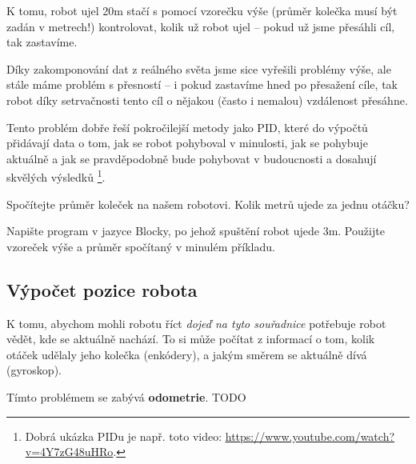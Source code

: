 \documentclass[../main.tex]{subfiles}
\begin{document}
	K tomu, robot ujel \si{20m} stačí s pomocí vzorečku výše (průměr kolečka musí být zadán v metrech!) kontrolovat, kolik už robot ujel -- pokud už jsme přesáhli cíl, tak zastavíme.

	Díky zakomponování dat z reálného světa jsme sice vyřešili problémy výše, ale stále máme problém s přesností -- i pokud zastavíme hned po přesažení cíle, tak robot díky setrvačnosti tento cíl o nějakou (často i nemalou) vzdálenost přesáhne.

	Tento problém dobře řeší pokročilejší metody jako PID, které do výpočtů přidávají data o tom, jak se robot pohyboval v minulosti, jak se pohybuje aktuálně a jak se pravděpodobně bude pohybovat v budoucnosti a dosahují skvělých výsledků \footnote{Dobrá ukázka PIDu je např. toto video: \href{https://www.youtube.com/watch?v=4Y7zG48uHRo}{https://www.youtube.com/watch?v=4Y7zG48uHRo}.}. 

	\begin{question}
		Spočítejte průměr koleček na našem robotovi. Kolik metrů ujede za jednu otáčku?
	\end{question}

	\begin{question}
		Napište program v jazyce Blocky, po jehož spuštění robot ujede \si{3m}. Použijte vzoreček výše a průměr spočítaný v minulém příkladu.
	\end{question}

	\subsection{Výpočet pozice robota}
	K tomu, abychom mohli robotu říct \textit{dojeď na tyto souřadnice} potřebuje robot vědět, kde se aktuálně nachází. To si může počítat z informací o tom, kolik otáček udělaly jeho kolečka (enkódery), a jakým směrem se aktuálně dívá (gyroskop).

	Tímto problémem se zabývá \textbf{odometrie}. TODO
\end{document}

